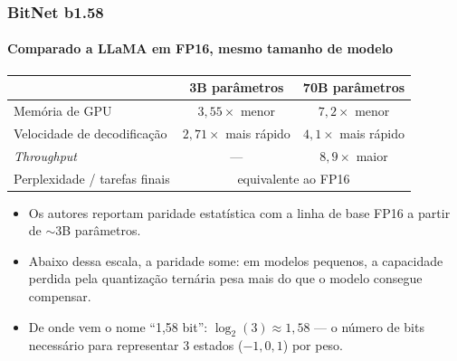 \begin{frame}
	\frametitle{BitNet b1.58}
	\framesubtitle{Comparado a LLaMA em FP16, mesmo tamanho de modelo \cite{ma2024era}}
	\begin{center}
		\begin{tabular}{lcc}
			\toprule
			& \textbf{3B parâmetros} & \textbf{70B parâmetros} \\
			\midrule
			Memória de GPU & $3{,}55\times$ menor & $7{,}2\times$ menor \\
			Velocidade de decodificação & $2{,}71\times$ mais rápido & $4{,}1\times$ mais rápido \\
			\textit{Throughput} & --- & $8{,}9\times$ maior \\
			Perplexidade / tarefas finais & \multicolumn{2}{c}{equivalente ao FP16} \\
			\bottomrule
		\end{tabular}
	\end{center}
	\vspace{2pt}
	\begin{itemize}
		\item Os autores reportam paridade estatística com a linha de base FP16 a partir de $\sim$3B parâmetros.\newline
		\item \alert{Abaixo dessa escala, a paridade some}: em modelos pequenos, a capacidade perdida pela quantização ternária pesa mais do que o modelo consegue compensar.\newline
		\item De onde vem o nome ``1,58 bit'': $\log_2(3) \approx 1{,}58$ --- o número de bits necessário para representar 3 estados ($-1,0,1$) por peso.
	\end{itemize}
\end{frame}

